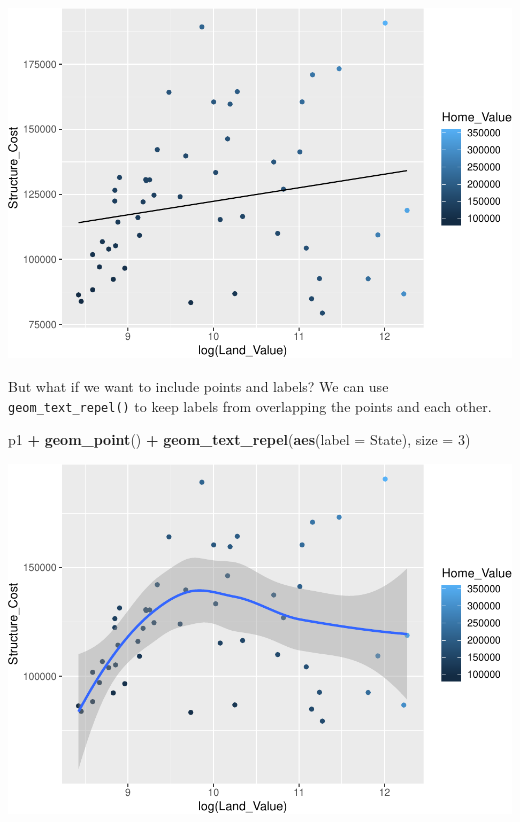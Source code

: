 \documentclass[
]{book}
\newenvironment{Shaded}{\begin{snugshade}}{\end{snugshade}}
\newcommand{\DataTypeTok}[1]{\textcolor[rgb]{0.13,0.29,0.53}{#1}}
\newcommand{\DecValTok}[1]{\textcolor[rgb]{0.00,0.00,0.81}{#1}}
\newcommand{\KeywordTok}[1]{\textcolor[rgb]{0.13,0.29,0.53}{\textbf{#1}}}
\newcommand{\NormalTok}[1]{#1}
\newcommand{\OperatorTok}[1]{\textcolor[rgb]{0.81,0.36,0.00}{\textbf{#1}}}
\newcommand{\StringTok}[1]{\textcolor[rgb]{0.31,0.60,0.02}{#1}}
\begin{document}
\includegraphics{R/Rgraphics/figures/unnamed-chunk-148-1.pdf}

But what if we want to include points and labels? We can use \texttt{geom\_text\_repel()} to keep labels from overlapping the points and each other.

\begin{Shaded}
\begin{Highlighting}[]
\NormalTok{p1 }\OperatorTok{+}\StringTok{ }
\StringTok{  }\KeywordTok{geom\_point}\NormalTok{() }\OperatorTok{+}\StringTok{ }
\StringTok{  }\KeywordTok{geom\_text\_repel}\NormalTok{(}\KeywordTok{aes}\NormalTok{(}\DataTypeTok{label =}\NormalTok{ State), }\DataTypeTok{size =} \DecValTok{3}\NormalTok{)}
\end{Highlighting}
\end{Shaded}

\includegraphics{R/Rgraphics/figures/unnamed-chunk-149-1.pdf}
\end{document}

